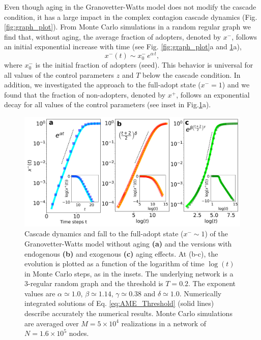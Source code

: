 Even though aging in the Granovetter-Watts model does not modify the cascade condition, it has a large impact in the complex contagion cascade dynamics (Fig.\ref{fig:graph_plot}). 
From Monte Carlo simulations in a random regular graph we find that, without aging,  the average fraction of adopters, denoted by $x^{-}$, follows an initial exponential increase with time (see Fig. \ref{fig:graph_plot}a and \ref{fig:models}a), 
\begin{equation}
x^{-}(t) \sim x^{-}_{0} \, e^{\alpha \, t},
\label{eq:exponential}
\end{equation}
where $x^{-}_{0}$ is the initial fraction of adopters (seed). This behavior is universal for all values of the control parameters $z$ and $T$ below the cascade condition. In addition, we investigated the approach to the full-adopt state ($x^{-} = 1$) and we found that the fraction of non-adopters, denoted by $x^{+}$, follows an exponential decay for all values of the control parameters (see inset in Fig.\ref{fig:models}a).

\begin{figure}
\centering \captionsetup{font=sf}
\includegraphics[width=0.8\columnwidth]{Figs/Aging_Threshold/EVO_MOD.pdf}
\caption[Cascade dynamics and fall to the full-adopt state ($x^{-} \sim 1$)]{\label{fig:models} Cascade dynamics and fall to the full-adopt state ($x^{-} \sim 1$) of the Granovetter-Watts model without aging \textbf{(a)} and the versions with endogenous \textbf{(b)} and exogenous \textbf{(c)} aging effects. At (b-c), the evolution is plotted as a function of the logarithm of time $\log{(t)}$ in Monte Carlo steps, as in the insets. The underlying network is a 3-regular random graph and the threshold is $T = 0.2$. The exponent values are $\alpha \simeq 1.0$, $\beta \simeq 1.14$, $\gamma \simeq 0.38$ and $\delta \simeq 1.0$. Numerically integrated solutions of Eq. \eqref{eq:AME_Threshold} (solid lines) describe accurately the numerical results. Monte Carlo simulations are averaged over $M = 5 \times 10^4$ realizations in a network of $N = 1.6 \times 10^5$ nodes.}
\end{figure}

